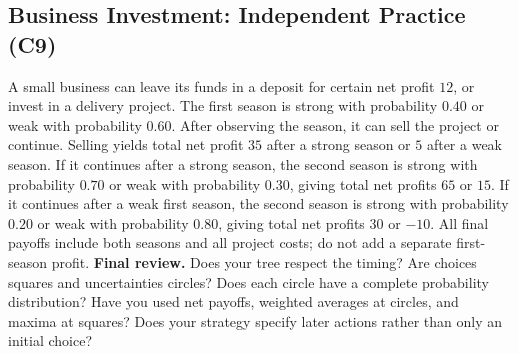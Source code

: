 \subsection{Business Investment: Independent Practice (C9)}\label{sec:investment}
A small business can leave its funds in a deposit for certain net profit $12$, or invest in a delivery project. The first season is strong with probability $0.40$ or weak with probability $0.60$. After observing the season, it can sell the project or continue. Selling yields total net profit $35$ after a strong season or $5$ after a weak season. If it continues after a strong season, the second season is strong with probability $0.70$ or weak with probability $0.30$, giving total net profits $65$ or $15$. If it continues after a weak first season, the second season is strong with probability $0.20$ or weak with probability $0.80$, giving total net profits $30$ or $-10$. All final payoffs include both seasons and all project costs; do not add a separate first-season profit.
\label{task:investment}
\textbf{Final review.} Does your tree respect the timing? Are choices squares and uncertainties circles? Does each circle have a complete probability distribution? Have you used net payoffs, weighted averages at circles, and maxima at squares? Does your strategy specify later actions rather than only an initial choice?


